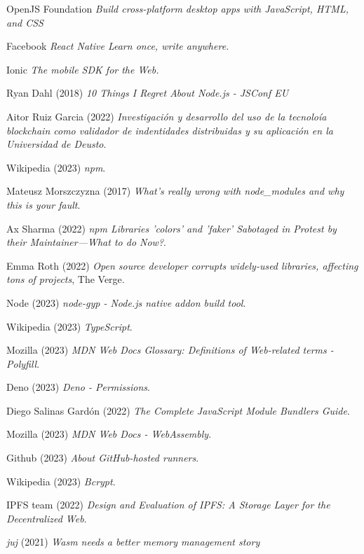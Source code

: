 \documentclass[10pt,journal,compsoc]{IEEEtran}
\begin{document}
\begin{thebibliography}{9}
    OpenJS Foundation \emph{Build cross-platform desktop apps with JavaScript, HTML, and CSS}

    Facebook \emph{React Native Learn once, write anywhere.}

    Ionic \emph{The mobile SDK for the Web.}

    Ryan Dahl (2018) \emph{10 Things I Regret About Node.js - JSConf EU}

    Aitor Ruiz Garcia (2022) \emph{Investigación y desarrollo del uso de la tecnoloía blockchain como validador de indentidades distribuidas y su aplicación en la Universidad de Deusto}.

    Wikipedia (2023) \emph{npm}.

    Mateusz Morszczyzna (2017) \emph{What's really wrong with node\_modules and why this is your fault}.

    Ax Sharma (2022) \emph{npm Libraries 'colors' and 'faker' Sabotaged in Protest by their Maintainer—What to do Now?}.

    Emma Roth (2022) \emph{Open source developer corrupts widely-used libraries, affecting tons of projects}, The Verge.

    Node (2023) \emph{node-gyp - Node.js native addon build tool}.

    Wikipedia (2023) \emph{TypeScript}.

    Mozilla (2023) \emph{MDN Web Docs Glossary: Definitions of Web-related terms - Polyfill}.

    Deno (2023) \emph{Deno - Permissions}.

    Diego Salinas Gardón (2022) \emph{The Complete JavaScript Module Bundlers Guide}.

    Mozilla (2023) \emph{MDN Web Docs - WebAssembly}.

    Github (2023) \emph{About GitHub-hosted runners}.

    Wikipedia (2023) \emph{Bcrypt}.

    IPFS team (2022) \emph{Design and Evaluation of IPFS: A Storage Layer for the Decentralized Web}.

    \textit{juj} (2021) \emph{Wasm needs a better memory management story}



\end{thebibliography}
\end{document}
